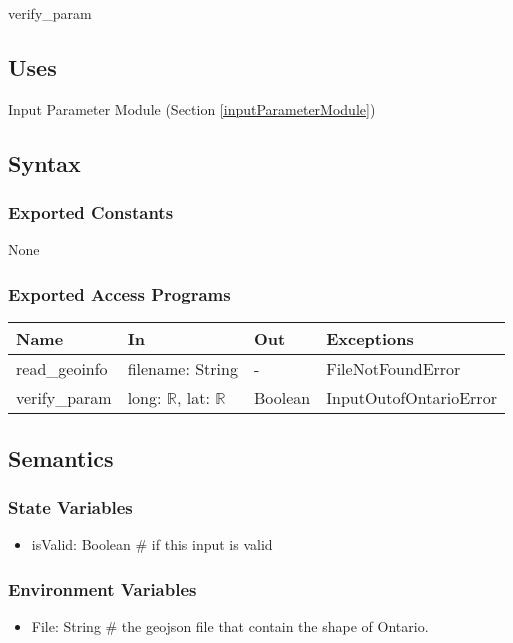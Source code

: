 \documentclass[12pt, titlepage]{article}
\begin{document}
verify\_param

\subsection{Uses}
Input Parameter Module (Section \ref{inputParameterModule})

\subsection{Syntax}

\subsubsection{Exported Constants}
None

\subsubsection{Exported Access Programs}

\begin{center}
\begin{tabular}{p{3cm} p{4cm} p{2cm} p{5cm}}
\hline
\textbf{Name} & \textbf{In} & \textbf{Out} & \textbf{Exceptions} \\
\hline
read\_geoinfo & filename: String & - & FileNotFoundError\\
verify\_param & long: $\mathbb{R}$, lat: $\mathbb{R}$ & Boolean & InputOutofOntarioError \\
\hline
\end{tabular}
\end{center}

\subsection{Semantics}

\subsubsection{State Variables}
\begin{itemize}

\item isValid: Boolean \# if this input is valid

\end{itemize}

\subsubsection{Environment Variables}
\begin{itemize}

\item File: String \# the geojson file that contain the shape of Ontario.

\end{itemize}
\end{document}
